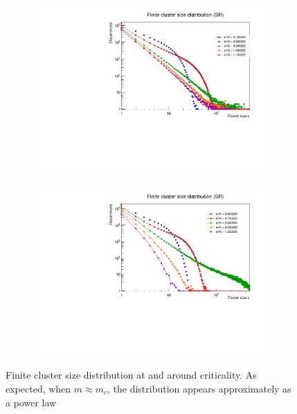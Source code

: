 \begin{figure}
	\begin{subfigure}[b]{0.45\linewidth}
		\includegraphics[width=\linewidth]{images/ClusterDistrPR.pdf}
	\end{subfigure}
	\hspace{0.5em}
	\begin{subfigure}[b]{0.45\linewidth}
		\includegraphics[width=\linewidth]{images/ClusterDistrSR.pdf}
	\end{subfigure}
	\caption{Finite cluster size distribution at and around criticality. As expected, when $m \approx m_c$, the distribution appears approximately as a power law}
	\label{fig:ClusterDistr}
\end{figure}
